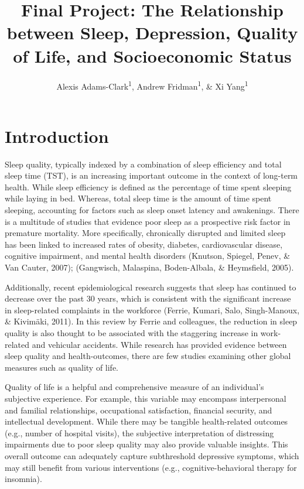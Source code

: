 \documentclass[man]{apa6}
\title{Final Project: The Relationship between Sleep, Depression, Quality of
Life, and Socioeconomic Status}
\author{Alexis Adams-Clark\textsuperscript{1}, Andrew
Fridman\textsuperscript{1}, \& Xi Yang\textsuperscript{1}}
\date{}
\affiliation{
\vspace{0.5cm}
\textsuperscript{1} University of Oregon Department of Psychology}
\theoremstyle{definition}
\theoremstyle{definition}
\theoremstyle{definition}
\theoremstyle{remark}
\begin{document}
\maketitle

\section{Introduction}\label{introduction}

Sleep quality, typically indexed by a combination of sleep efficiency
and total sleep time (TST), is an increasing important outcome in the
context of long-term health. While sleep efficiency is defined as the
percentage of time spent sleeping while laying in bed. Whereas, total
sleep time is the amount of time spent sleeping, accounting for factors
such as sleep onset latency and awakenings. There is a multitude of
studies that evidence poor sleep as a prospective risk factor in
premature mortality. More specifically, chronically disrupted and
limited sleep has been linked to increased rates of obesity, diabetes,
cardiovascular disease, cognitive impairment, and mental health
disorders (Knutson, Spiegel, Penev, \& Van Cauter, 2007); (Gangwisch,
Malaspina, Boden-Albala, \& Heymsfield, 2005).

Additionally, recent epidemiological research suggests that sleep has
continued to decrease over the past 30 years, which is consistent with
the significant increase in sleep-related complaints in the workforce
(Ferrie, Kumari, Salo, Singh-Manoux, \& Kivimäki, 2011). In this review
by Ferrie and colleagues, the reduction in sleep quality is also thought
to be associated with the staggering increase in work-related and
vehicular accidents. While research has provided evidence between sleep
quality and health-outcomes, there are few studies examining other
global measures such as quality of life.

Quality of life is a helpful and comprehensive measure of an
individual's subjective experience. For example, this variable may
encompass interpersonal and familial relationships, occupational
satisfaction, financial security, and intellectual development. While
there may be tangible health-related outcomes (e.g., number of hospital
visits), the subjective interpretation of distressing impairments due to
poor sleep quality may also provide valuable insights. This overall
outcome can adequately capture subthreshold depressive symptoms, which
may still benefit from various interventions (e.g., cognitive-behavioral
therapy for insomnia).
\end{document}

